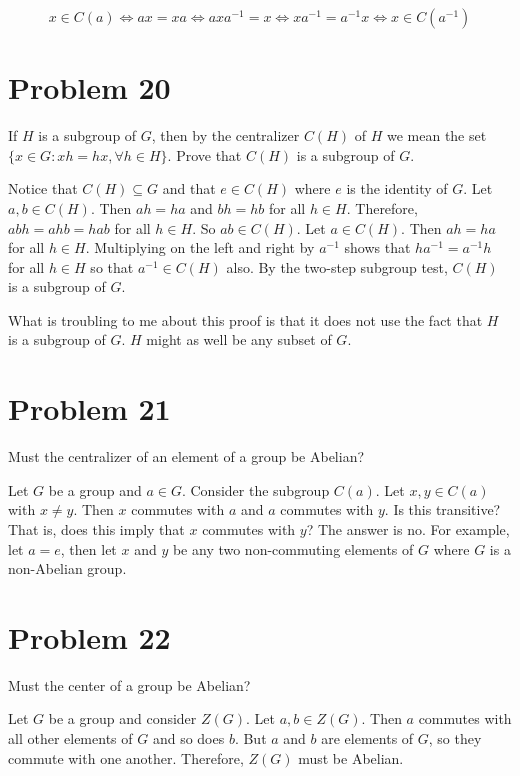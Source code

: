 \documentclass{article}
\begin{document}
\begin{equation*}
x\in C(a)\Leftrightarrow ax=xa\Leftrightarrow axa^{-1}=x\Leftrightarrow xa^{-1}=a^{-1}x
\Leftrightarrow x\in C(a^{-1})
\end{equation*}

\section*{Problem 20}

If $H$ is a subgroup of $G$, then by the centralizer $C(H)$ of $H$ we mean the
set $\{x\in G:xh=hx,\forall h\in H\}$.  Prove that $C(H)$ is a subgroup of $G$.

Notice that $C(H)\subseteq G$ and that $e\in C(H)$ where $e$ is the identity of $G$.
Let $a,b\in C(H)$.  Then $ah=ha$ and $bh=hb$ for all $h\in H$.  Therefore,
$abh=ahb=hab$ for all $h\in H$.  So $ab\in C(H)$.  Let $a\in C(H)$.  Then
$ah=ha$ for all $h\in H$.  Multiplying on the left and right by $a^{-1}$
shows that $ha^{-1}=a^{-1}h$ for all $h\in H$ so that $a^{-1}\in C(H)$ also.
By the two-step subgroup test, $C(H)$ is a subgroup of $G$.

What is troubling to me about this proof is that it does not use the fact that
$H$ is a subgroup of $G$.  $H$ might as well be any subset of $G$.

\section*{Problem 21}

Must the centralizer of an element of a group be Abelian?

Let $G$ be a group and $a\in G$.  Consider the subgroup $C(a)$.
Let $x,y\in C(a)$ with $x\neq y$.  Then $x$ commutes with $a$ and
$a$ commutes with $y$.  Is this transitive?  That is, does this imply
that $x$ commutes with $y$?  The answer is no.  For example, let
$a=e$, then let $x$ and $y$ be any two non-commuting elements of $G$
where $G$ is a non-Abelian group.

\section*{Problem 22}

Must the center of a group be Abelian?

Let $G$ be a group and consider $Z(G)$.  Let $a,b\in Z(G)$.
Then $a$ commutes with all other elements of $G$ and so does $b$.
But $a$ and $b$ are elements of $G$, so they commute with one another.
Therefore, $Z(G)$ must be Abelian.
\end{document}
